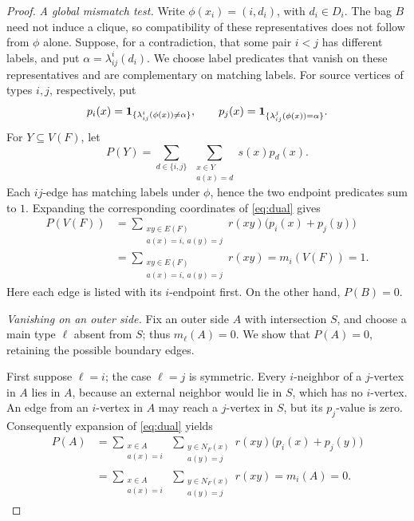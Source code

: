 \begin{proof}
\smallskip
\noindent\emph{A global mismatch test.}
Write \(\phi(x_i)=(i,d_i)\), with \(d_i\in D_i\).
The bag \(B\) need not induce a clique, so compatibility of these
representatives does not follow from \(\phi\) alone.
Suppose, for a contradiction, that some pair \(i<j\) has different
labels, and put \(\alpha=\lambda_{ij}^i(d_i)\).
We choose label predicates that vanish on these representatives and are
complementary on matching labels. For source vertices of types \(i,j\),
respectively, put
\[
p_i(x)=\mathbf 1_{\{\lambda_{ij}^i(\phi(x))\ne\alpha\}},
\qquad
p_j(x)=\mathbf 1_{\{\lambda_{ij}^j(\phi(x))=\alpha\}}.
\]
For \(Y\subseteq V(F)\), let
\[
P(Y)=\sum_{d\in\{i,j\}}\ \sum_{\substack{x\in Y\\a(x)=d}}
                   s(x)p_d(x).
\]
Each \(ij\)-edge has matching labels under \(\phi\), hence the
two endpoint predicates sum to \(1\).  Expanding the corresponding
coordinates of \eqref{eq:dual} gives
\begin{equation}\label{eq:global-mismatch}
\begin{aligned}
P(V(F))
 &=\sum_{\substack{xy\in E(F)\\a(x)=i,\ a(y)=j}}
          r(xy)\bigl(p_i(x)+p_j(y)\bigr)\\
 &=\sum_{\substack{xy\in E(F)\\a(x)=i,\ a(y)=j}}r(xy)
   =m_i(V(F))=1.
\end{aligned}
\end{equation}
Here each edge is listed with its \(i\)-endpoint first.
On the other hand, \(P(B)=0\).

\smallskip
\noindent\emph{Vanishing on an outer side.}
Fix an outer side \(A\) with intersection \(S\), and choose a main type
\(\ell\) absent from \(S\); thus \(m_\ell(A)=0\).
We show that \(P(A)=0\), retaining the possible boundary edges.

First suppose \(\ell=i\); the case \(\ell=j\) is symmetric.
Every \(i\)-neighbor of a \(j\)-vertex in \(A\) lies in \(A\),
because an external neighbor would lie in \(S\), which has no
\(i\)-vertex.  An edge from an \(i\)-vertex in \(A\) may reach a
\(j\)-vertex in \(S\), but its \(p_j\)-value is zero.
Consequently expansion of \eqref{eq:dual} yields
\[
\begin{aligned}
P(A)
 &=\sum_{\substack{x\in A\\a(x)=i}}
       \ \sum_{\substack{y\in N_F(x)\\a(y)=j}}
         r(xy)\bigl(p_i(x)+p_j(y)\bigr)\\
 &=\sum_{\substack{x\in A\\a(x)=i}}
       \ \sum_{\substack{y\in N_F(x)\\a(y)=j}}r(xy)
   =m_i(A)=0.
\end{aligned}
\]


\end{proof}
